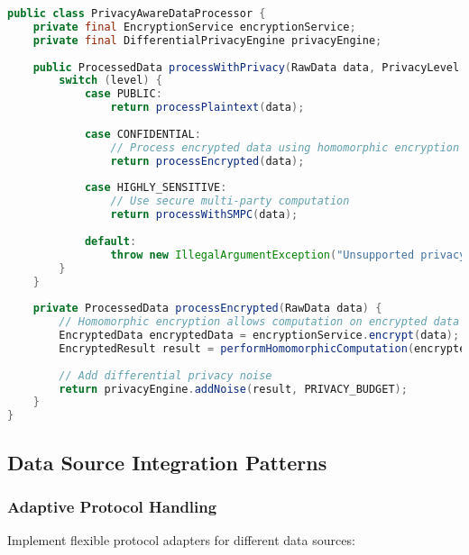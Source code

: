 \documentclass[11pt,a4paper]{article}
\begin{document}
\begin{lstlisting}[language=Java, caption=Privacy-Preserving Data Processing]
public class PrivacyAwareDataProcessor {
    private final EncryptionService encryptionService;
    private final DifferentialPrivacyEngine privacyEngine;
    
    public ProcessedData processWithPrivacy(RawData data, PrivacyLevel level) {
        switch (level) {
            case PUBLIC:
                return processPlaintext(data);
                
            case CONFIDENTIAL:
                // Process encrypted data using homomorphic encryption
                return processEncrypted(data);
                
            case HIGHLY_SENSITIVE:
                // Use secure multi-party computation
                return processWithSMPC(data);
                
            default:
                throw new IllegalArgumentException("Unsupported privacy level");
        }
    }
    
    private ProcessedData processEncrypted(RawData data) {
        // Homomorphic encryption allows computation on encrypted data
        EncryptedData encryptedData = encryptionService.encrypt(data);
        EncryptedResult result = performHomomorphicComputation(encryptedData);
        
        // Add differential privacy noise
        return privacyEngine.addNoise(result, PRIVACY_BUDGET);
    }
}
\end{lstlisting}

\subsection{Data Source Integration Patterns}

\subsubsection{Adaptive Protocol Handling}

Implement flexible protocol adapters for different data sources:
\end{document}
